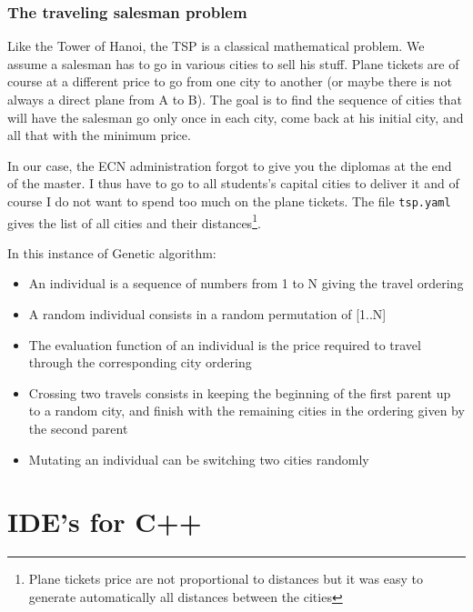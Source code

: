 \documentclass{ecnreport}
\begin{document}
\subsubsection{The traveling salesman problem}

Like the Tower of Hanoi, the TSP is a classical mathematical problem. We assume a salesman has to go in various cities to sell his stuff. Plane tickets are of course at a different price to go from one city to another (or maybe there is not always a direct plane from A to B). The goal is to find the sequence of cities that will have the salesman go only once in each city, come back at his initial city, and all that with the minimum price.

In our case, the ECN administration forgot to give you the diplomas at the end of the master. I thus have to go to all students's capital cities to deliver it and of course I do not want to spend too much on the plane tickets. The file \texttt{tsp.yaml} gives the list of all cities and their distances\footnote{Plane tickets price are not proportional to distances but it was easy to generate automatically all distances between the cities}.

In this instance of Genetic algorithm:
\begin{itemize}
\item An individual is a sequence of numbers from 1 to N giving the travel ordering
\item A random individual consists in a random permutation of [1..N]
\item The evaluation function of an individual is the price required to travel through the corresponding city ordering
\item Crossing two travels consists in keeping the beginning of the first parent up to a random city, and finish with the remaining cities in the ordering given by the second parent
\item Mutating an individual can be switching two cities randomly
\end{itemize}

 \begin{itemize}
 \end{itemize}

\newpage
\appendix

\section{IDE's for C++}\label{app:soft}
\end{document}
